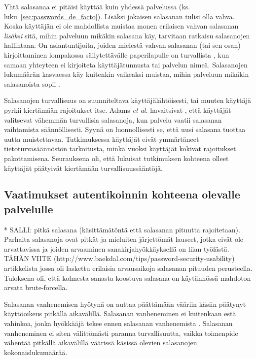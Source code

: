 \documentclass[english,gradu]{tktltiki}
\begin{document}
         Yhtä salasanaa ei pitäisi käyttää kuin yhdessä palvelussa (ks. luku~\ref{sec:passwords_de_facto}). Lisäksi jokaisen salasanan tulisi olla vahva. Koska käyttäjän ei ole mahdollista muistaa monen erilaisen vahvan salasanan \emph{lisäksi} sitä, mihin palveluun mikäkin salasana käy, tarvitaan ratkaisu salasanojen hallintaan. On asiantuntijoita, joiden mielestä vahvan salasanan (tai sen osan) kirjoittaminen lompakossa säilytettävälle paperilapulle on turvallista \cite{fsecure_passwords_on_postit_09, microsoft_guru_write_your_password_05, schneier_changing_passwords_10, schneier_choosing_passwords_07, schneier_write_down_your_password_05}, kun samaan yhteyteen ei kirjoiteta käyttäjätunnusta tai palvelun nimeä. Salasanojen lukumäärän kasvaessa käy kuitenkin vaikeaksi muistaa, mihin palveluun mikäkin salasanoista sopii \cite{study_of_passwords_07}.

         Salasanojen turvallisuus on suunniteltava käyttäjälähtöisesti, tai muuten käyttäjä pyrkii kiertämään rajoitukset itse. Adams \emph{et al.} havaitsivat \cite{users_are_not_the_enemy_99}, että käyttäjät valitsevat vähemmän turvallisia salasanoja, kun palvelu vaatii salasanan vaihtamista säännöllisesti. Syynä on luonnollisesti se, että uusi salasana tuottaa uutta muistettavaa. Tutkimuksessa käyttäjät eivät ymmärtäneet tietoturvasäännöstön tarkoitusta, minkä vuoksi käyttäjät kokivat rajoitukset pakottamisena. Seurauksena oli, että lukuisat tutkimuksen kohteena olleet käyttäjät päätyivät kiertämään turvallisuussääntöjä.



\subsection{Vaatimukset autentikoinnin kohteena olevalle palvelulle} %
\label{sub:vaatimukset_autentikoinnin_kohteena_olevalle_palvelulle}

* SALLI: pitkä salasana (käsittämätöntä että salasanan pituutta rajoitetaan). Parhaita salasanoja ovat pitkät ja mieluiten järjettömät lauseet, jotka eivät ole arvattavissa ja joiden arvaaminen sanakirjahyökkäyksellä on liian työlästä. TÄHÄN VIITE (http://www.baekdal.com/tips/password-security-usability) artikkelista jossa oli laskettu erilaisia arvausaikoja salasanan pituuden perusteella. Tuloksena oli, että kolmesta sanasta koostuva salasana on käytännössä mahdoton arvata brute-forcella.

Salasanan vanhenemisen hyötynä on auttaa päättämään vääriin käsiin päätynyt käyttöoikeus pitkällä aikavälillä. Salasanan vanheneminen ei kuitenkaan estä vahinkoa, jonka hyökkääjä tekee ennen salasanan vanhenemista \cite{lopsa_pw_expiry_06}. Salasanan vanheneminen ei siten välittömästi paranna turvallisuutta, vaikka toimenpide vähentää pitkällä aikavälillä väärissä käsissä olevien salasanojen kokonaislukumäärää.
\end{document}
